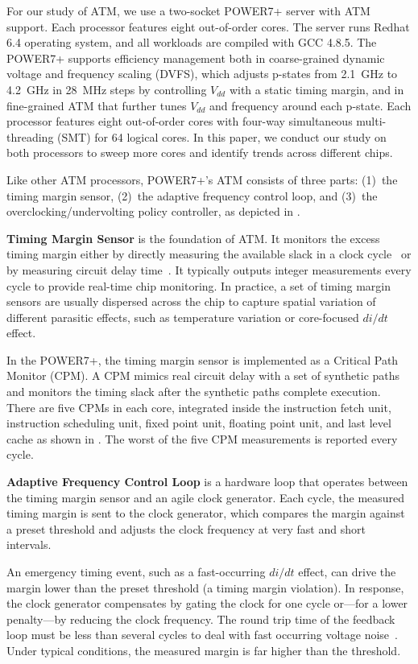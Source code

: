 For our study of ATM, we use a two-socket POWER7+ server with ATM support. Each processor features eight out-of-order cores. The server runs Redhat 6.4 operating system, and all workloads are compiled with GCC 4.8.5. The POWER7+ supports efficiency management both in coarse-grained dynamic voltage and frequency scaling (DVFS), which adjusts p-states from 2.1~GHz to 4.2~GHz in 28~MHz steps by controlling $V_{dd}$ with a static timing margin, and in fine-grained ATM that further tunes $V_{dd}$ and frequency around each p-state.
Each processor features eight out-of-order cores with four-way simultaneous multi-threading (SMT) for 64 logical cores. In this paper, we conduct our study on both processors to sweep more cores and identify trends across different chips. 

Like other ATM processors, POWER7+'s ATM consists of three parts: (1)~the timing margin sensor, (2)~the adaptive frequency control loop, and (3)~the overclocking/undervolting policy controller, as depicted in .

\textbf{Timing Margin Sensor} is the foundation of ATM. It monitors the excess timing margin either by directly measuring the available slack in a clock cycle~\cite{drake2007distributed} or by measuring circuit delay time~\cite{grenat20145}. It typically outputs integer measurements every cycle to provide real-time chip monitoring. In practice, a set of timing margin sensors are usually dispersed across the chip to capture spatial variation of different parasitic effects, such as temperature variation or core-focused $di/dt$ effect.

In the POWER7+, the timing margin sensor is implemented as a Critical Path Monitor (CPM). A CPM mimics real circuit delay with a set of synthetic paths and monitors the timing slack after the synthetic paths complete execution. There are five CPMs in each core, integrated inside the instruction fetch unit, instruction scheduling unit, fixed point unit, floating point unit, and last level cache as shown in . The worst of the five CPM measurements is reported every cycle.


\textbf{Adaptive Frequency Control Loop} is a hardware loop that operates between the timing margin sensor and an agile clock generator. Each cycle, the measured timing margin is sent to the clock generator, which compares the margin against a preset threshold and adjusts the clock frequency at very fast and short intervals.

An emergency timing event, such as a fast-occurring $di/dt$ effect, can drive the margin lower than the preset threshold (a timing margin violation). In response, the clock generator compensates by gating the clock for one cycle or---for a lower penalty---by reducing the clock frequency. The round trip time of the feedback loop must be less than several cycles to deal with fast occurring voltage noise~\cite{vezyrtzis2018droop}. Under typical conditions, the measured margin is far higher than the threshold.

